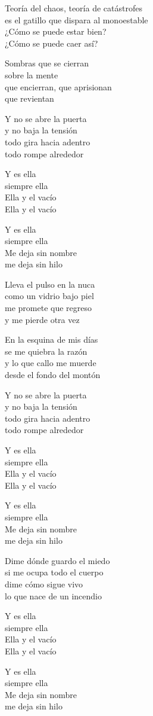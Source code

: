 \begin{lyrics}
Teoría del chaos, teoría de catástrofes\\
es el gatillo que dispara al monoestable\\
¿Cómo se puede estar bien?\\
¿Cómo se puede caer así?

Sombras que se cierran\\
sobre la mente\\
que encierran, que aprisionan\\
que revientan

Y no se abre la puerta\\
y no baja la tensión\\
todo gira hacia adentro\\
todo rompe alrededor

Y es ella\\
siempre ella\\
Ella y el vacío\\
Ella y el vacío

Y es ella\\
siempre ella\\
Me deja sin nombre\\
me deja sin hilo

Lleva el pulso en la nuca\\
como un vidrio bajo piel\\
me promete que regreso\\
y me pierde otra vez

En la esquina de mis días\\
se me quiebra la razón\\
y lo que callo me muerde\\
desde el fondo del montón

Y no se abre la puerta\\
y no baja la tensión\\
todo gira hacia adentro\\
todo rompe alrededor

Y es ella\\
siempre ella\\
Ella y el vacío\\
Ella y el vacío

Y es ella\\
siempre ella\\
Me deja sin nombre\\
me deja sin hilo

Dime dónde guardo el miedo\\
si me ocupa todo el cuerpo\\
dime cómo sigue vivo\\
lo que nace de un incendio

Y es ella\\
siempre ella\\
Ella y el vacío\\
Ella y el vacío

Y es ella\\
siempre ella\\
Me deja sin nombre\\
me deja sin hilo
\end{lyrics}

